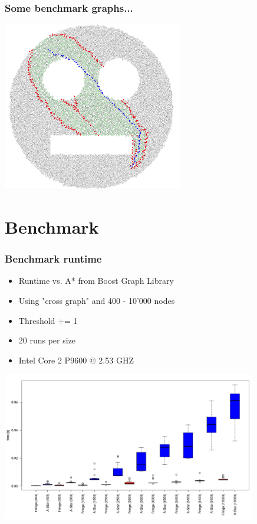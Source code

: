 \documentclass{beamer}
\begin{document}
\begin{frame}
\frametitle{Some benchmark graphs...}
\begin{center}
	\includegraphics[height=210pt]{smiley.png}
\end{center}
\end{frame}

\section{Benchmark}

\begin{frame}
\frametitle{Benchmark runtime}
\begin{itemize}
\item Runtime vs. A* from Boost Graph Library
\item Using "cross graph" and 400 - 10'000 nodes
\item Threshold += 1
\item 20 runs per size
\item Intel Core 2 P9600 @ 2.53 GHZ
\end{itemize}
\begin{center}
	\includegraphics[height=184pt]{boxplot.png}
\end{center}
\end{frame}
\end{document}
